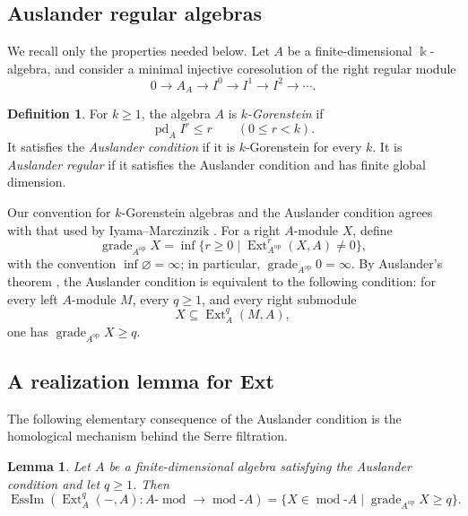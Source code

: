 \documentclass[12pt,reqno]{amsart}
\newtheorem{lemma}[theorem]{Lemma}
\theoremstyle{definition}
\newtheorem{definition}[theorem]{Definition}
\theoremstyle{remark}
\newcommand{\Ext}{\operatorname{Ext}}
\newcommand{\grade}{\operatorname{grade}}
\newcommand{\EssIm}{\operatorname{EssIm}}
\newcommand{\modcat}{\operatorname{mod}}
\begin{document}
\subsection{Auslander regular algebras}

We recall only the properties needed below.  Let $A$ be a finite-dimensional $\Bbbk$-algebra, and consider a minimal injective coresolution of the right regular module
\[
0\longrightarrow A_A\longrightarrow I^0\longrightarrow I^1\longrightarrow I^2\longrightarrow\cdots.
\]

\begin{definition}
For $k\ge1$, the algebra $A$ is \emph{$k$-Gorenstein} if
\[
\operatorname{pd}_A I^r\le r
\qquad (0\le r<k).
\]
It satisfies the \emph{Auslander condition} if it is $k$-Gorenstein for every $k$.  It is \emph{Auslander regular} if it satisfies the Auslander condition and has finite global dimension.
\end{definition}

Our convention for $k$-Gorenstein algebras and the Auslander condition agrees with that used by Iyama--Marczinzik \cite{IM}.  For a right $A$-module $X$, define
$$
\grade_{A^{\mathrm{op}}} X
=
\inf\{r\ge0\mid \Ext^r_{A^{\mathrm{op}}}(X,A)\ne0\},
$$
with the convention $\inf\varnothing=\infty$; in particular,
$\grade_{A^{\mathrm{op}}}0=\infty$.
By Auslander's theorem \cite[Theorem~3.7]{FGR}, the Auslander condition is equivalent to the following condition: for every left $A$-module $M$, every $q\ge1$, and every right submodule
$$
X\subseteq\Ext_A^q(M,A),
$$
one has $\grade_{A^{\mathrm{op}}} X\ge q.$


\subsection{A realization lemma for Ext}

The following elementary consequence of the Auslander condition is the homological mechanism behind the Serre filtration.

\begin{lemma}\label{lem:realization}
Let $A$ be a finite-dimensional algebra satisfying the Auslander condition and let $q\ge1$.  Then
\[
\EssIm\left(
\Ext_A^q(-,A):A\text{-}\modcat\longrightarrow\modcat\text{-}A
\right)
=
\{X\in\modcat\text{-}A\mid \grade_{A^{\mathrm{op}}} X\ge q\}.
\]
\end{lemma}
\end{document}

